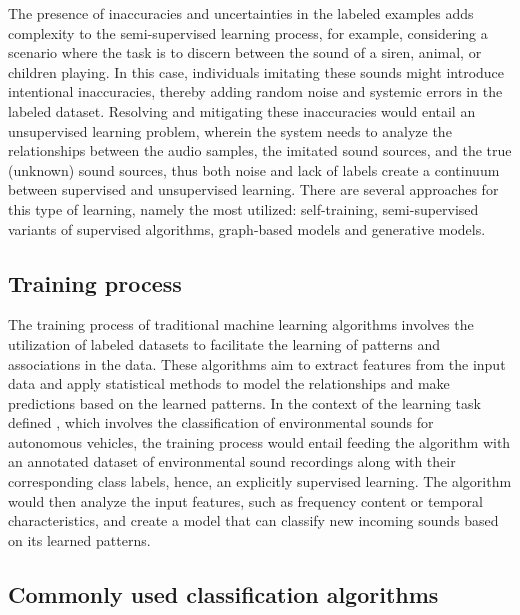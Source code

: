 The presence of inaccuracies and uncertainties in the labeled examples adds complexity to the semi-supervised learning process, for example, considering a scenario where the task is to discern between the sound of a siren, animal, or children playing. In this case, individuals imitating these sounds might introduce intentional inaccuracies, thereby adding random noise and systemic errors in the labeled dataset. Resolving and mitigating these inaccuracies would entail an unsupervised learning problem, wherein the system needs to analyze the relationships between the audio samples, the imitated sound sources, and the true (unknown) sound sources, thus both noise and lack of labels create a continuum between supervised and unsupervised learning. There are several approaches for this type of learning, namely the most utilized: self-training, semi-supervised variants of supervised algorithms, graph-based models and generative models.


\subsection{Training process}
\label{subsec:machine_learning_training}

The training process of traditional machine learning algorithms involves the utilization of labeled datasets to facilitate the learning of patterns and associations in the data. These algorithms aim to extract features from the input data and apply statistical methods to model the relationships and make predictions based on the learned patterns. In the context of the learning task defined \cite{Mitchell1997}, which involves the classification of environmental sounds for autonomous vehicles, the training process would entail feeding the algorithm with an annotated dataset of environmental sound recordings along with their corresponding class labels, hence, an explicitly supervised learning. The algorithm would then analyze the input features, such as frequency content or temporal characteristics, and create a model that can classify new incoming sounds based on its learned patterns.


\subsection{Commonly used classification algorithms}
\label{subsec:machine_learning_common_classification}

